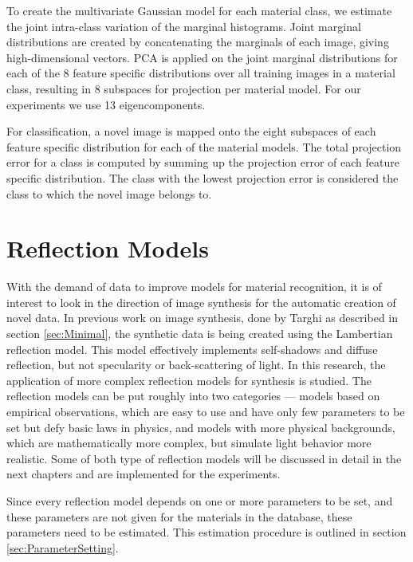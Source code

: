 To create the multivariate Gaussian model for each material class, we estimate the joint intra-class variation of the marginal histograms. Joint marginal distributions are created by concatenating the marginals of each image, giving high-dimensional vectors. PCA is applied on the joint marginal distributions for each of the 8 feature specific distributions over all training images in a material class, resulting in 8 subspaces for projection per material model. For our experiments we use 13 eigencomponents.

For classification, a novel image is mapped onto the eight subspaces of each feature specific distribution for each of the material models. The total projection error for a class is computed by summing up the projection error of each feature specific distribution. The class with the lowest projection error is considered the class to which the novel image belongs to. 

\section{Reflection Models}\label{sec:ReflectionModels}
With the demand of data to improve models for material recognition, it is of interest to look in the direction of image synthesis for the automatic creation of novel data. In previous work on image synthesis, done by Targhi as described in section \ref{sec:Minimal}, the synthetic data is being created using the Lambertian reflection model. This model effectively implements self-shadows and diffuse reflection, but not specularity or back-scattering of light. In this research, the application of more complex reflection models for synthesis is studied. The reflection models can be put roughly into two categories --- models based on empirical observations, which are easy to use and have only few parameters to be set but defy basic laws in physics, and models with more physical backgrounds, which are mathematically more complex, but simulate light behavior more realistic. Some of both type of reflection models will be discussed in detail in the next chapters and are implemented for the experiments.

Since every reflection model depends on one or more parameters to be set, and these parameters are not given for the materials in the database, these parameters need to be estimated. This estimation procedure is outlined in section \ref{sec:ParameterSetting}.



